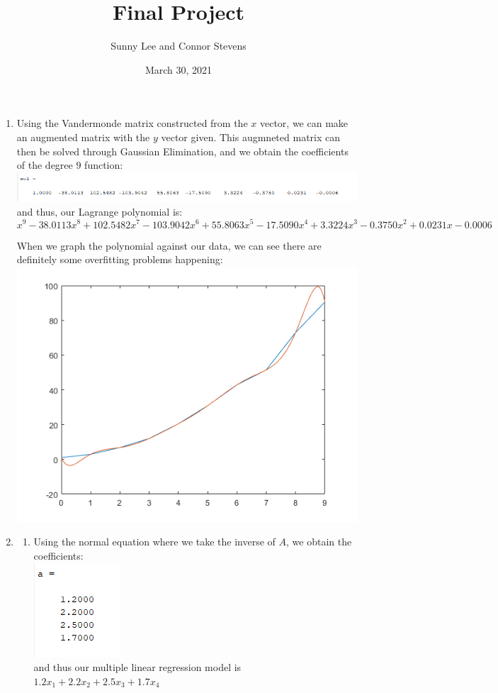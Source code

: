 \documentclass{article}
\title{Final Project}
\author{Sunny Lee and Connor Stevens}
\date{March 30, 2021}
\begin{document}
\begin{enumerate}
    \item Using the Vandermonde matrix constructed from the $x$ vector, we can make an 
    augmented matrix with the $y$ vector given. This augmneted matrix can then be solved
    through Gaussian Elimination, and we obtain the coefficients of the degree $9$ 
    function: \\
    \includegraphics[scale = .7]{coefficients.png}\\
    and thus, our Lagrange polynomial is: 
    \[
        x^9-38.0113x^8+102.5482x^7-103.9042x^6+55.8063x^5-17.5090x^4+3.3224x^3-0.3750x^2+0.0231x-0.0006
    \]

    When we graph the polynomial against our data, we can see there are definitely
    some overfitting problems happening: \\
    \includegraphics{number1graph.png}\\

    \item 
    \begin{enumerate}
        \item Using the normal equation where we take the inverse of $A$, we obtain
        the coefficients: \\
        \includegraphics{number2a.png}\\
        and thus our multiple linear regression model is 
        $1.2x_1+2.2x_2+2.5x_3+1.7x_4$
        \pagebreak


\end{enumerate}
\end{enumerate}
\end{document}
